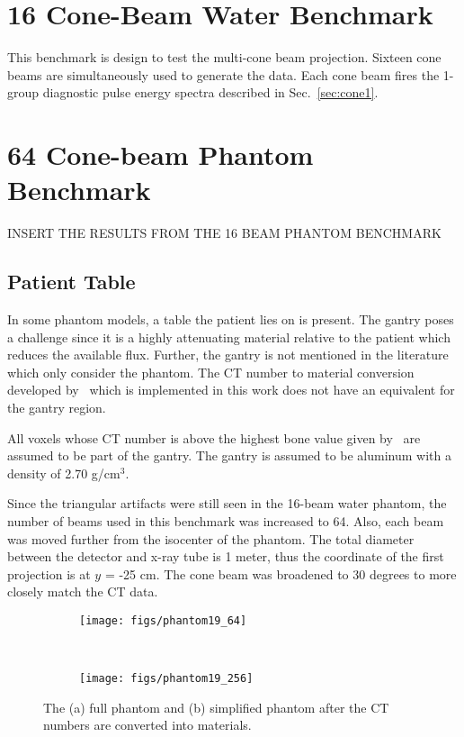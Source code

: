 \section{16 Cone-Beam Water Benchmark}

This benchmark is design to test the multi-cone beam projection. Sixteen cone beams are simultaneously used to generate the data. Each cone beam fires the 1-group diagnostic pulse energy spectra described in Sec.~\ref{sec:cone1}.

\section{64 Cone-beam Phantom Benchmark}

INSERT THE RESULTS FROM THE 16 BEAM PHANTOM BENCHMARK

\subsection{Patient Table}
In some phantom models, a table the patient lies on is present. The gantry poses a challenge since it is a highly attenuating material relative to the patient which reduces the available flux. Further, the gantry is not mentioned in the literature which only consider the phantom. The CT number to material conversion developed by~\citet{ref:ottossonr} which is implemented in this work does not have an equivalent for the gantry region.

All voxels whose CT number is above the highest bone value given by~\citet{ref:ottossonr} are assumed to be part of the gantry. The gantry is assumed to be aluminum with a density of 2.70 g/cm$^{3}$.

Since the triangular artifacts were still seen in the 16-beam water phantom, the number of beams used in this benchmark was increased to 64. Also, each beam was moved further from the isocenter of the phantom. The total diameter between the detector and x-ray tube is 1 meter, thus the coordinate of the first projection is at $y$ = -25 cm. The cone beam was broadened to 30 degrees to more closely match the CT data.

\begin{figure}
    \centering
    \begin{subfigure}[b]{0.45\textwidth}
        \texttt{[image: figs/phantom19\_64]}
        \caption{}
        \label{fig:waterHistLin}
    \end{subfigure}
    ~
    \begin{subfigure}[b]{0.45\textwidth}
        \texttt{[image: figs/phantom19\_256]}
        \caption{}
        \label{fig:waterHistLog}
    \end{subfigure}
    \caption{The (a) full phantom and (b) simplified phantom after the CT numbers are converted into materials.}\label{fig:waterHist}
\end{figure}

